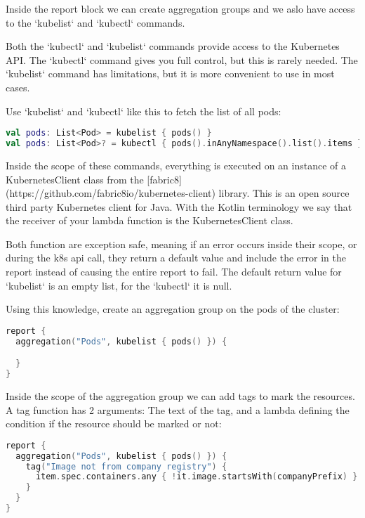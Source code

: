 Inside the report block we can create aggregation groups and we aslo have access to the `kubelist` and `kubectl` commands.

Both the `kubectl` and `kubelist` commands provide access to the Kubernetes API. The `kubectl` command gives you full control, but this is rarely needed. The `kubelist` command has limitations, but it is more convenient to use in most cases.

Use `kubelist` and `kubectl` like this to fetch the list of all pods:

\begin{lstlisting}[caption={TODO},language=Kotlin,label=code:todo]
val pods: List<Pod> = kubelist { pods() }
val pods: List<Pod>? = kubectl { pods().inAnyNamespace().list().items }
\end{lstlisting}

Inside the scope of these commands, everything is executed on an instance of a KubernetesClient class from the [fabric8](https://github.com/fabric8io/kubernetes-client) library. This is an open source third party Kubernetes client for Java. With the Kotlin terminology we say that the receiver of your lambda function is the KubernetesClient class.

Both function are exception safe, meaning if an error occurs inside their scope, or during the k8s api call, they return a default value and include the error in the report instead of causing the entire report to fail. The default return value for `kubelist` is an empty list, for the `kubectl` it is null.

Using this knowledge, create an aggregation group on the pods of the cluster:

\begin{lstlisting}[caption={TODO},language=Kotlin,label=code:todo]
report {
  aggregation("Pods", kubelist { pods() }) {

  }
}
\end{lstlisting}

Inside the scope of the aggregation group we can add tags to mark the resources. A tag function has 2 arguments: The text of the tag, and a lambda defining the condition if the resource should be marked or not:

\begin{lstlisting}[caption={TODO},language=Kotlin,label=code:todo]
report {
  aggregation("Pods", kubelist { pods() }) {
    tag("Image not from company registry") {
      item.spec.containers.any { !it.image.startsWith(companyPrefix) }
    }
  }
}
\end{lstlisting}

